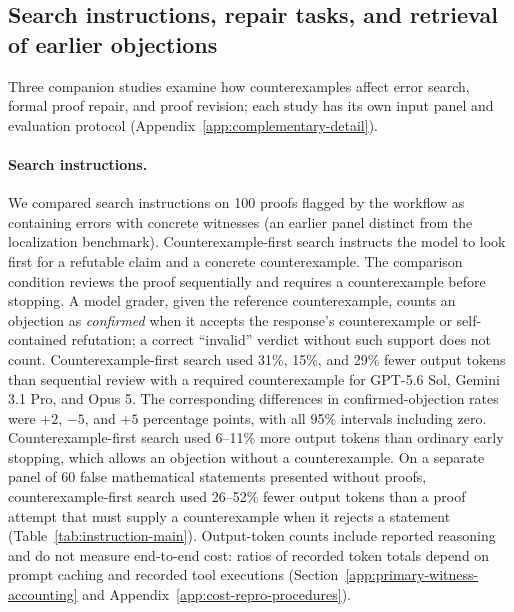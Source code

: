 \subsection{Search instructions, repair tasks, and retrieval of earlier objections}
\label{sec:complementary}
Three companion studies examine how counterexamples affect error search, formal proof repair, and proof revision; each study has its own input panel and evaluation protocol (Appendix~\ref{app:complementary-detail}).

\paragraph{Search instructions.}
We compared search instructions on 100 proofs flagged by the workflow as containing errors with concrete witnesses (an earlier panel distinct from the localization benchmark). Counterexample-first search instructs the model to look first for a refutable claim and a concrete counterexample. The comparison condition reviews the proof sequentially and requires a counterexample before stopping. A model grader, given the reference counterexample, counts an objection as \emph{confirmed} when it accepts the response's counterexample or self-contained refutation; a correct ``invalid'' verdict without such support does not count. Counterexample-first search used 31\%, 15\%, and 29\% fewer output tokens than sequential review with a required counterexample for GPT-5.6 Sol, Gemini 3.1 Pro, and Opus 5. The corresponding differences in confirmed-objection rates were $+2$, $-5$, and $+5$ percentage points, with all 95\% intervals including zero. Counterexample-first search used 6--11\% more output tokens than ordinary early stopping, which allows an objection without a counterexample. On a separate panel of 60 false mathematical statements presented without proofs, counterexample-first search used 26--52\% fewer output tokens than a proof attempt that must supply a counterexample when it rejects a statement (Table~\ref{tab:instruction-main}). Output-token counts include reported reasoning and do not measure end-to-end cost: ratios of recorded token totals depend on prompt caching and recorded tool executions (Section~\ref{app:primary-witness-accounting} and Appendix~\ref{app:cost-repro-procedures}).


